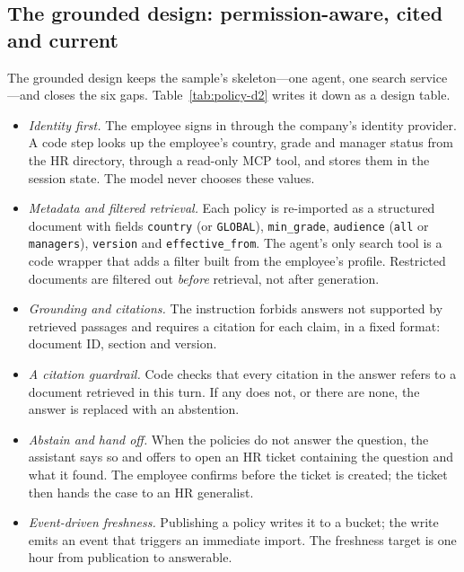 \subsection{The grounded design: permission-aware, cited and current}

The grounded design keeps the sample's skeleton---one agent, one search service---and closes the six gaps. Table~\ref{tab:policy-d2} writes it down as a design table.

\begin{itemize}[itemsep=2pt]
  \item \emph{Identity first.} The employee signs in through the company's identity provider. A code step looks up the employee's country, grade and manager status from the HR directory, through a read-only MCP tool, and stores them in the session state. The model never chooses these values.
  \item \emph{Metadata and filtered retrieval.} Each policy is re-imported as a structured document with fields \texttt{country} (or \texttt{GLOBAL}), \texttt{min\_grade}, \texttt{audience} (\texttt{all} or \texttt{managers}), \texttt{version} and \texttt{effective\_from}. The agent's only search tool is a code wrapper that adds a filter built from the employee's profile. Restricted documents are filtered out \emph{before} retrieval, not after generation.
  \item \emph{Grounding and citations.} The instruction forbids answers not supported by retrieved passages and requires a citation for each claim, in a fixed format: document ID, section and version.
  \item \emph{A citation guardrail.} Code checks that every citation in the answer refers to a document retrieved in this turn. If any does not, or there are none, the answer is replaced with an abstention.
  \item \emph{Abstain and hand off.} When the policies do not answer the question, the assistant says so and offers to open an HR ticket containing the question and what it found. The employee confirms before the ticket is created; the ticket then hands the case to an HR generalist.
  \item \emph{Event-driven freshness.} Publishing a policy writes it to a bucket; the write emits an event that triggers an immediate import. The freshness target is one hour from publication to answerable.
\end{itemize}

